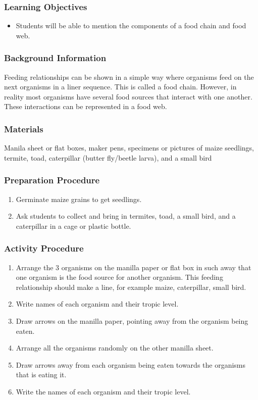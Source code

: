 \subsubsection*{Learning Objectives}
\begin{itemize}
\item{Students will be able to mention the components of a food chain and food web.}
\end{itemize}

\subsubsection*{Background Information}
Feeding relationships can be shown in a simple way where organisms feed on the next organisms in a liner sequence. This is called a food chain. However, in reality most organisms have several food sources that interact with one another. These interactions can be represented in a food web.

\subsubsection*{Materials}
Manila sheet or flat boxes, maker pens, specimens or pictures of maize seedlings, termite, toad, caterpillar (butter fly/beetle larva), and a small bird

\subsubsection*{Preparation Procedure}
\begin{enumerate}
\item{Germinate maize grains to get seedlings.}
\item{Ask students to collect and bring in termites, toad, a small bird, and a caterpillar in a cage or plastic bottle.}
\end{enumerate}

\subsubsection*{Activity Procedure}
\begin{enumerate}

\item{Arrange the 3 organisms on the manilla paper or flat box in such away that one organism is the food source for another organism. This feeding relationship should make a line, for example maize, caterpillar, small bird.}
\item{Write names of each organism and their tropic level.}
\item{Draw arrows on the manilla paper, pointing away from the organism being eaten.}
\item{Arrange all the organisms randomly on the other manilla sheet.}
\item{Draw arrows away from each organism being eaten towards the organisms that is eating it.}
\item{Write the names of each organism and their tropic level.}

\end{enumerate}

